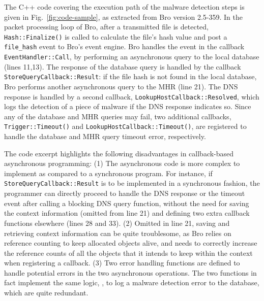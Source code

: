 The C++ code covering the execution path of the malware detection steps is given in Fig.~\ref{fig:code-sample}, as extracted from Bro version 2.5-359. In the packet processing loop of Bro, after a transmitted file is detected, \lstinline[style=InlineStyle]{Hash::Finalize()} is called to calculate the file's hash value and post a \lstinline[style=InlineStyle]{file_hash} event to Bro's event engine. Bro handles the event in the callback \lstinline[style=InlineStyle]{EventHandler::Call}, by performing an asynchronous query to the local database (lines 11,13). The response of the database query is handled by the callback \lstinline[style=InlineStyle]{StoreQueryCallback::Result}: if the file hash is not found in the local database, Bro performs another asynchronous query to the MHR (line 21). The DNS response is handled by a second callback, \lstinline[style=InlineStyle]{LookupHostCallback::Resolved}, which logs the detection of a piece of malware if the DNS response indicates so. %
 Since any of the database and MHR queries may fail, two additional callbacks, \lstinline[style=InlineStyle]{Trigger::Timeout()} and \lstinline[style=InlineStyle]{LookupHostCallback::Timeout()}, are registered to handle the database and MHR query timeout error, respectively.

The code excerpt highlights the following disadvantages in callback-based asynchronous programming:
(1) The asynchronous code is more complex to implement as compared to a synchronous program. For instance, if \lstinline[style=InlineStyle]{StoreQueryCallback::Result} is to be implemented in a synchronous fashion, the programmer can directly proceed to handle the DNS response or the timeout event after calling a blocking DNS query function, without the need for saving the context information (omitted from line 21) and defining two extra callback functions elsewhere (lines 28 and 33). %
(2) Omitted in line 21, saving and retrieving context information can be quite troublesome, as Bro relies on reference counting to keep allocated objects alive, and needs to correctly increase the reference counts of all the objects that it intends to keep within the context when registering a callback.
(3) Two error handling functions are defined to handle potential errors in the two asynchronous operations. The two functions in fact implement the same logic, \ie, to log a malware detection error to the database, which are quite redundant.



